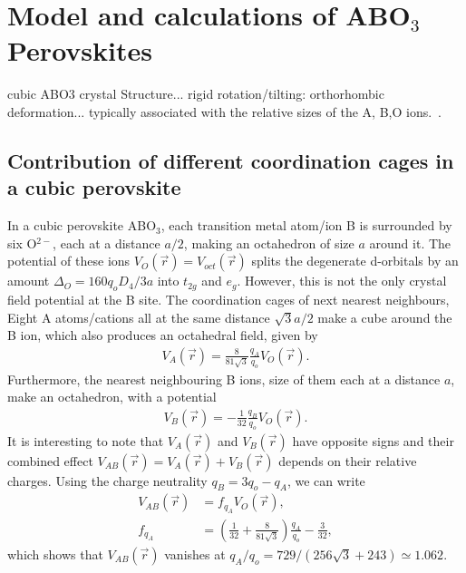 \documentclass[a4paper,prb,twocolumn]{revtex4-1}  %
\begin{document}
\section{Model and calculations of ABO$_3$ Perovskites}%
\label{sec:calc}

cubic ABO3 crystal Structure... 
rigid rotation/tilting: orthorhombic deformation... 
typically associated with the relative sizes of the A, B,O ions.~\cite{ZhouPRL05}.


\subsection{Contribution of different coordination cages in a cubic perovskite}
\label{sec:relativeVoctABO}

In a cubic perovskite ABO$_3$,
each transition metal atom/ion B
is surrounded by six O$^{2-}$, each at a distance $a/2$,
 making an octahedron of size $a$ around it.
The potential of these ions $V_{O}(\vec r)= V_{oct}(\vec r)$
splits the degenerate d-orbitals
by an amount ${\Delta_O=160q_oD_{4}/3a}$
 into $t_{2g}$ and $e_g$.
However, this is not the only crystal field potential at the B site.
The coordination cages of next nearest neighbours, 
Eight A atoms/cations all at the same distance $\sqrt{3}a/2$
make a cube around the B ion,
which also produces an octahedral field, given by 
\begin{align}
V_{A}(\vec r) = \frac{8}{81 \sqrt{3}}\frac{q_A}{q_o} V_{O}(\vec r).
\end{align}
Furthermore,
the nearest neighbouring B ions, size of them each at a distance $a$,
make an octahedron, with a potential 
\begin{align}
V_{B}(\vec r) = -\frac{1}{32}\frac{q_B}{q_o}V_{O}(\vec r).
\end{align}
It is interesting to note that 
$V_{A}(\vec r)$ and $V_{B}(\vec r)$ have opposite signs
and 
their combined effect 
$V_{AB}(\vec r) = V_{A}(\vec r)+ V_{B}(\vec r)$
depends on their relative charges.
Using the charge neutrality $q_B=3q_o-q_A$,
we can write 
\begin{align}
V_{AB}(\vec r) &= f_{q_A}V_{O}(\vec r),\\
f_{q_A} &= \left(\frac{1}{32}+\frac{8}{81 \sqrt{3}}\right)\frac{q_A}{q_o} -\frac{3}{32},
\end{align}
which shows that ${V_{AB}(\vec r)}$ vanishes
at
$q_A/q_o=729/({256 \sqrt{3}+243}) {\simeq 1.062}$.
\end{document}
